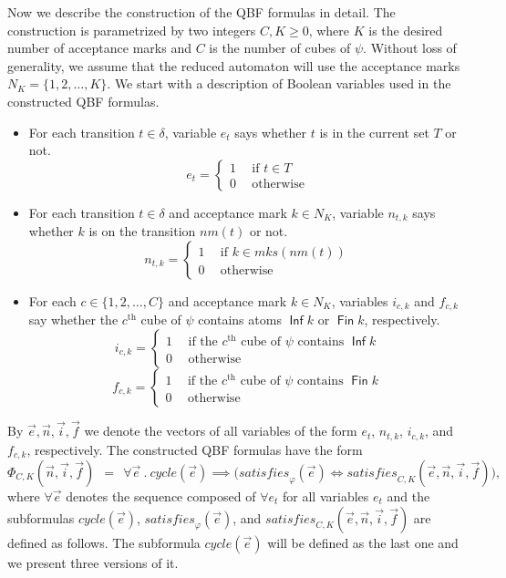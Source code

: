 \documentclass[a4paper,UKenglish,cleveref,autoref,thm-restate]{lipics-v2021}
\DeclareMathOperator{\Inf}{\mathsf{Inf}}
\DeclareMathOperator{\Fin}{\mathsf{Fin}}
\newcommand{\mks}{\mathit{mks}}
\newcommand{\rem}{\mathit{nm}}
\newcommand{\mcycle}{\mathit{cycle}}
\newcommand{\msat}{\mathit{satisfies}}
\begin{document}
Now we describe the construction of the QBF formulas in detail. The
construction is parametrized by two integers $C,K\ge 0$, where $K$ is
the desired number of acceptance marks and $C$ is the number of cubes
of $\psi$. Without loss of generality, we assume that the reduced
automaton will use the acceptance marks $N_K=\{1,2,\ldots,K\}$.
We start with a description of Boolean variables used in the
constructed QBF formulas.
\begin{itemize}
\item For each transition $t\in\delta$, variable $e_t$ says whether
  $t$ is in the current set $T$ or not.
  \[e_t=\left\{
      \begin{array}{ll}
        1~~ & \textrm{if }t\in T\\[.5ex]
        0 & \textrm{otherwise}    
      \end{array}\right.
  \]
\item For each transition $t\in\delta$ and acceptance mark $k\in N_K$,
  variable $n_{t,k}$ says whether $k$ is on the transition
  $\rem(t)$ or not.
  \[n_{t,k}=\left\{
      \begin{array}{ll}
        1~~ & \textrm{if }k\in\mks(\rem(t))\\[.5ex]
        0 & \textrm{otherwise}    
      \end{array}\right.
  \]
\item For each $c\in\{1,2,\ldots,C\}$ and acceptance mark $k\in N_K$,
  variables $i_{c,k}$ and $f_{c,k}$ say whether the $c^\textrm{th}$
  cube of $\psi$ contains atoms $\Inf k$ or $\Fin k$, respectively.
  \[i_{c,k}=\left\{
      \begin{array}{ll}
        1~~ & \textrm{if the $c^\textrm{th}$ cube of $\psi$ contains $\Inf k$}\\[.5ex]
        0 & \textrm{otherwise}    
      \end{array}\right.
  \]
  \[f_{c,k}=\left\{
      \begin{array}{ll}
        1~~ & \textrm{if the $c^\textrm{th}$ cube of $\psi$ contains $\Fin k$}\\[.5ex]
        0 & \textrm{otherwise}    
      \end{array}\right.
  \]

\end{itemize}
By $\vec{e},\vec{n},\vec{i},\vec{f}$ we denote the vectors of all
variables of the form $e_t$, $n_{t,k}$, $i_{c,k}$, and $f_{c,k}$,
respectively. The constructed QBF formulas have the form 
\[
  \Phi_{C,K}(\vec{n},\vec{i},\vec{f})~~=~~\forall \vec{e}~.~\mcycle(\vec{e})\implies\big(\msat_\varphi(\vec{e}) \iff \msat_{C,K}(\vec{e},\vec{n},\vec{i},\vec{f})\big),
\]
where $\forall\vec{e}$ denotes the sequence composed of $\forall e_t$
for all variables $e_t$ and the subformulas $\mcycle(\vec{e})$,
$\msat_\varphi(\vec{e})$, and
$\msat_{C,K}(\vec{e},\vec{n},\vec{i},\vec{f})$ are defined as
follows. The subformula $\mcycle(\vec{e})$ will be defined as the last
one and we present three versions of it.
\end{document}
